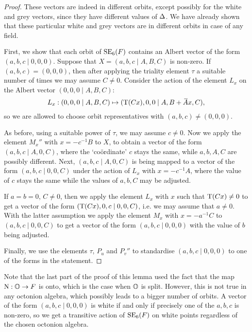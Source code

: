 \begin{proof}
	These vectors are indeed in different orbits, except possibly for the white 
	and grey vectors, since they have different values of $\Delta$. We have already
	shown that these particular 
	white and grey vectors are in different orbits in case of any field. 
	
	First, we show that each orbit of $\mathrm{SE}_6(F)$ contains an Albert vector of the form
	$(a,b,c\mid 0,0,0)$. Suppose that $X = (a,b,c\mid A,B,C)$ is non-zero. If
	\mbox{$(a,b,c) = (0,0,0)$}, then after applying the triality element $\tau$ a suitable number
	of times we may assume $C \neq 0$. Consider the action of the element $L_x$ on
	the Albert vector $(0,0,0\mid A,B,C)$: 
	\begin{equation*}
		\begin{array}{r@{\;}c@{\;}l}
			L_x: (0,0,0\mid A,B,C) & \mapsto & (\Tr(Cx),0,0\mid A,B+\ovA x, C),
		\end{array}
	\end{equation*}
	so we are allowed to choose orbit representatives with $(a,b,c) \neq (0,0,0)$. 
	
	As before, using a suitable power of $\tau$, we may assume $c \neq 0$. Now we apply 
	the element $M_x''$ with $x = -c^{-1}B$ to $X$, to obtain a vector of the form
	\mbox{$(a,b,c\mid A,0,C)$}, where the `co\"{o}rdinate' $c$ stays the same, while 
	$a,b,A,C$ are possibly different. Next,
	$(a,b,c\mid A,0,C)$ is being mapped
	to a vector of the form $(a,b,c\mid 0,0,C)$ under the action of $L_x$ with
	$x = -c^{-1}A$, where the value of $c$ stays the same while the values of 
	$a,b,C$ may be adjusted. 
	
	If $a=b=0$, $C \neq 0$, then we apply the element $L_x$ with $x$ such that 
	\mbox{$\operatorname{T}(Cx)\neq 0$} to get a vector of the form $(\operatorname{T}(Cx),0,c\mid 0,0,C)$, i.e.
	we may assume that \mbox{$a \neq 0$}. With the latter assumption we apply the element
	$M_x$ with $x = -a^{-1} C$ to \mbox{$(a,b,c\mid 0,0,C)$} to get a vector of the form
	$(a,b,c\mid 0,0,0)$ with the value of $b$ being adjusted. 
	
	Finally, we use the elements $\tau$, $P_u$ and $P_v''$ to standardise $(a,b,c\mid 0,0,0)$ to one of the forms in the statement. 
\end{proof}

Note that the last part of the proof of this lemma used the fact that the map
\mbox{$\mathord{\mathrm{N}} : \mathbb{O} \rightarrow F$} is onto, which is the case when $\mathbb{O}$ is split. 
However, this is not true in any octonion algebra, which possibly leads 
to a bigger number of orbits. A vector of the form $(a,b,c\mid 0,0,0)$ is 
white if and only if precisely one of the $a,b,c$ is non-zero, so we get 
a transitive action of $\mathrm{SE}_6(F)$ on white points regardless of the 
chosen octonion algebra. 


